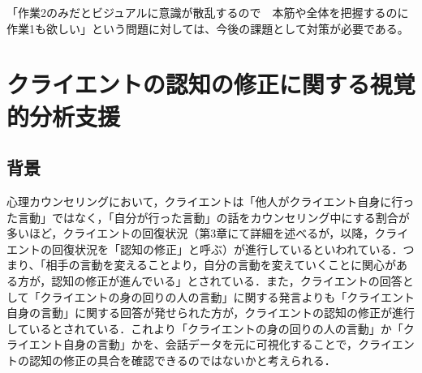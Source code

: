 \documentclass[shuuron]{kuee}
\begin{document}
「作業2のみだとビジュアルに意識が散乱するので　本筋や全体を把握するのに作業1も欲しい」という問題に対しては、今後の課題として対策が必要である。





\chapter{クライエントの認知の修正に関する視覚的分析支援}
\section{背景}

心理カウンセリングにおいて，クライエントは「他人がクライエント自身に行った言動」ではなく，「自分が行った言動」の話をカウンセリング中にする割合が多いほど，クライエントの回復状況（第3章にて詳細を述べるが，以降，クライエントの回復状況を「認知の修正」と呼ぶ）が進行しているといわれている．つまり、「相手の言動を変えることより，自分の言動を変えていくことに関心がある方が，認知の修正が進んでいる」\cite{zokad}とされている．また，クライエントの回答として「クライエントの身の回りの人の言動」に関する発言よりも「クライエント自身の言動」に関する回答が発せられた方が，クライエントの認知の修正が進行しているとされている．これより「クライエントの身の回りの人の言動」か「クライエント自身の言動」かを、会話データを元に可視化することで，クライエントの認知の修正の具合を確認できるのではないかと考えられる．

\end{document}
